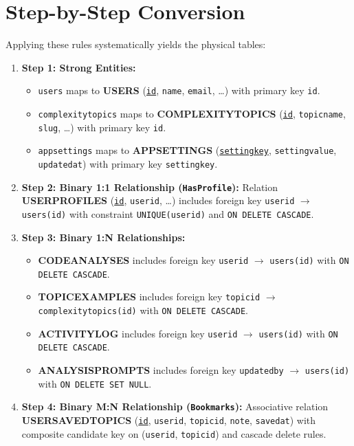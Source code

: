 \documentclass[12pt,a4paper]{report}
\DeclareRobustCommand{\_}{\textunderscore\allowbreak}
\begin{document}
\section{Step-by-Step Conversion}
Applying these rules systematically yields the physical tables:
\begin{enumerate}
    \item \textbf{Step 1: Strong Entities:}
    \begin{itemize}
        \item \texttt{users} maps to \textbf{USERS} (\underline{\texttt{id}}, \texttt{name}, \texttt{email}, \dots) with primary key \texttt{id}.
        \item \texttt{complexity\_topics} maps to \textbf{COMPLEXITY\_TOPICS} (\underline{\texttt{id}}, \texttt{topic\_name}, \texttt{slug}, \dots) with primary key \texttt{id}.
        \item \texttt{app\_settings} maps to \textbf{APP\_SETTINGS} (\underline{\texttt{setting\_key}}, \texttt{setting\_value}, \texttt{updated\_at}) with primary key \texttt{setting\_key}.
    \end{itemize}
    \item \textbf{Step 2: Binary 1:1 Relationship (\texttt{Has\_Profile}):}
    Relation \textbf{USER\_PROFILES} (\underline{\texttt{id}}, \texttt{user\_id}, \dots) includes foreign key \texttt{user\_id} $\rightarrow$ \texttt{users(id)} with constraint \texttt{UNIQUE(user\_id)} and \texttt{ON DELETE CASCADE}.
    \item \textbf{Step 3: Binary 1:N Relationships:}
    \begin{itemize}
        \item \textbf{CODE\_ANALYSES} includes foreign key \texttt{user\_id} $\rightarrow$ \texttt{users(id)} with \texttt{ON DELETE CASCADE}.
        \item \textbf{TOPIC\_EXAMPLES} includes foreign key \texttt{topic\_id} $\rightarrow$ \texttt{complexity\_topics(id)} with \texttt{ON DELETE CASCADE}.
        \item \textbf{ACTIVITY\_LOG} includes foreign key \texttt{user\_id} $\rightarrow$ \texttt{users(id)} with \texttt{ON DELETE CASCADE}.
        \item \textbf{ANALYSIS\_PROMPTS} includes foreign key \texttt{updated\_by} $\rightarrow$ \texttt{users(id)} with \texttt{ON DELETE SET NULL}.
    \end{itemize}
    \item \textbf{Step 4: Binary M:N Relationship (\texttt{Bookmarks}):}
    Associative relation \textbf{USER\_SAVED\_TOPICS} (\underline{\texttt{id}}, \texttt{user\_id}, \texttt{topic\_id}, \texttt{note}, \texttt{saved\_at}) with composite candidate key on (\texttt{user\_id}, \texttt{topic\_id}) and cascade delete rules.
\end{enumerate}
\end{document}
